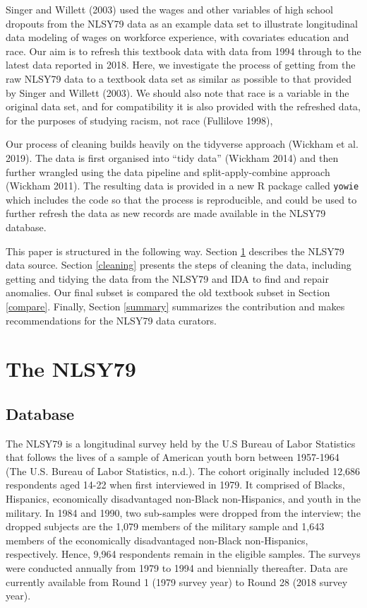 \documentclass[12pt]{article}
\begin{document}
Singer and Willett (2003) used the wages and other variables of high school dropouts from the NLSY79 data as an example data set to illustrate longitudinal data modeling of wages on workforce experience, with covariates education and race. Our aim is to refresh this textbook data with data from 1994 through to the latest data reported in 2018. Here, we investigate the process of getting from the raw NLSY79 data to a textbook data set as similar as possible to that provided by Singer and Willett (2003). We should also note that race is a variable in the original data set, and for compatibility it is also provided with the refreshed data, for the purposes of studying racism, not race (Fullilove 1998),

Our process of cleaning builds heavily on the tidyverse approach (Wickham et al. 2019). The data is first organised into ``tidy data'' (Wickham 2014) and then further wrangled using the data pipeline and split-apply-combine approach (Wickham 2011). The resulting data is provided in a new R package called \texttt{yowie} which includes the code so that the process is reproducible, and could be used to further refresh the data as new records are made available in the NLSY79 database.

This paper is structured in the following way. Section \ref{database} describes the NLSY79 data source. Section \ref{cleaning} presents the steps of cleaning the data, including getting and tidying the data from the NLSY79 and IDA to find and repair anomalies. Our final subset is compared the old textbook subset in Section \ref{compare}. Finally, Section \ref{summary} summarizes the contribution and makes recommendations for the NLSY79 data curators.

\hypertarget{database}{%
\section{The NLSY79}\label{database}}

\hypertarget{database-1}{%
\subsection{Database}\label{database-1}}

The NLSY79 is a longitudinal survey held by the U.S Bureau of Labor Statistics that follows the lives of a sample of American youth born between 1957-1964 (The U.S. Bureau of Labor Statistics, n.d.). The cohort originally included 12,686 respondents aged 14-22 when first interviewed in 1979. It comprised of Blacks, Hispanics, economically disadvantaged non-Black non-Hispanics, and youth in the military. In 1984 and 1990, two sub-samples were dropped from the interview; the dropped subjects are the 1,079 members of the military sample and 1,643 members of the economically disadvantaged non-Black non-Hispanics, respectively. Hence, 9,964 respondents remain in the eligible samples. The surveys were conducted annually from 1979 to 1994 and biennially thereafter. Data are currently available from Round 1 (1979 survey year) to Round 28 (2018 survey year).
\end{document}
